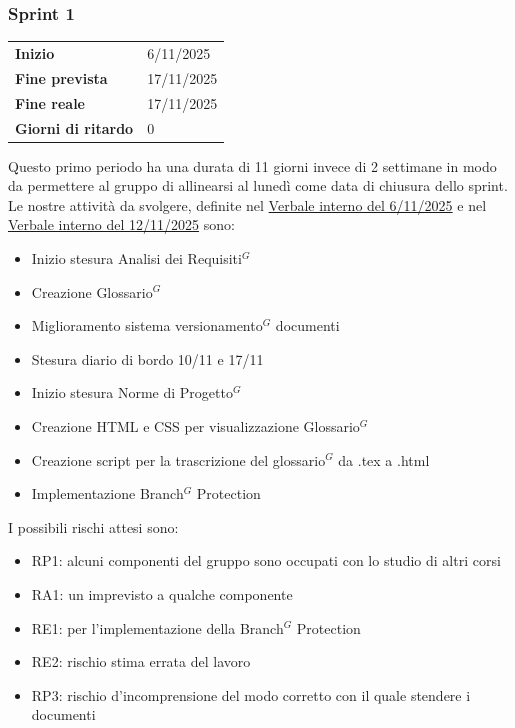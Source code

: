 \subsubsection{Sprint 1}


\begin{tabular}{p{} p{}}
	\textbf{Inizio} & 6/11/2025 \\
	\textbf{Fine prevista} & 17/11/2025 \\
	\textbf{Fine reale} & 17/11/2025 \\
	\textbf{Giorni di ritardo} & 0
\end{tabular}
\newline \newline
Questo primo periodo ha una durata di 11 giorni invece di 2 settimane in modo da permettere al gruppo di allinearsi al lunedì come data di chiusura dello sprint.\\
Le nostre attività da svolgere, definite nel \href{https://nullpointersgroup.github.io/Documentazione/output/RTB/Verbali%20Interni/2025-11-06_verbale_interno.pdf}{Verbale interno del 6/11/2025} e nel \href{https://nullpointersgroup.github.io/Documentazione/output/RTB/Verbali%20Interni/2025-11-12_verbale_interno.pdf}{Verbale interno del 12/11/2025} sono:
\begin{itemize}[itemsep=5pt, parsep=1pt, label=$\scriptstyle\bullet$]
	\item Inizio stesura Analisi dei Requisiti$^G$
	\item Creazione Glossario$^G$
	\item Miglioramento sistema versionamento$^G$ documenti
	\item Stesura diario di bordo 10/11 e 17/11
	\item Inizio stesura Norme di Progetto$^G$
	\item Creazione HTML e CSS per visualizzazione Glossario$^G$
	\item Creazione script per la trascrizione del glossario$^G$ da .tex a .html
	\item Implementazione Branch$^G$ Protection
\end{itemize}


I possibili rischi attesi sono:
\begin{itemize}[itemsep=5pt, parsep=1pt, label=$\scriptstyle\bullet$]
	\item RP1: alcuni componenti del gruppo sono occupati con lo studio di altri corsi
	\item RA1: un imprevisto a qualche componente
	\item RE1: per l'implementazione della Branch$^G$ Protection
	\item RE2: rischio stima errata del lavoro
	\item RP3: rischio d'incomprensione del modo corretto con il quale stendere i documenti
\end{itemize}

